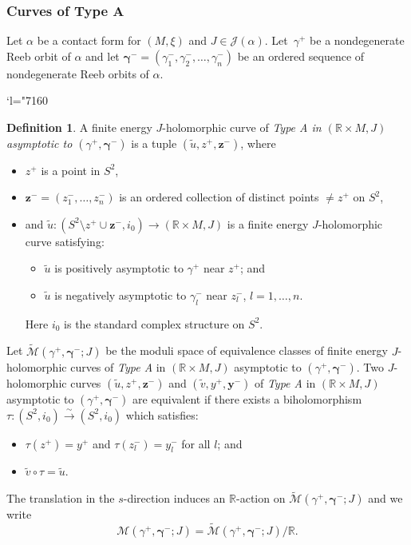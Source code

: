 \documentclass[JEP,XML,SOM,Unicode,NoFloatCountersInSection]{cedram}
\let\mathcal\mathscr
\newcommand{\isom}{\stackrel\sim\longrightarrow}
\newcommand{\bmy}{\boldsymbol{y}}
\newcommand{\bmz}{\boldsymbol{z}}
\newcommand{\Changel}{\mathcode`l="7160}
\theoremstyle{plain}
\theoremstyle{definition}
\newtheorem{defn}[thm]{Definition}
\numberwithin{equation}{subsection}
\newcommand{\RR}{\mathbb{R}}
\let\bs\boldsymbol
\begin{document}
\subsubsection{Curves of Type A} \label{subsubsection: A}

Let $\alpha$ be a contact form for $(M,\xi)$ and $J\in \mathcal{J}(\alpha)$. Let~$\gamma^+$ be a nondegenerate Reeb orbit of $\alpha$ and let $\bs\gamma^-=(\gamma^-_1,\gamma^-_2,\dots,\gamma^-_n)$ be an ordered sequence of nondegenerate Reeb orbits of $\alpha$.

\bgroup
\Changel
\begin{defn}
A finite energy $J$-holomorphic curve of \emph{Type A in $(\mathbb{R}\times M,J)$ asymptotic to $(\gamma^+,\bs\gamma^-)$} is a tuple $(\widetilde{u},z^+,\bmz^-)$, where
\begin{itemize}
\item
$z^+$ is a point in $S^2$,
\item
$\bmz^-=(z^-_1,\dots,z^-_n)$ is an ordered collection of distinct points $\not=z^+$ on $S^2$,
\item
and $\widetilde{u}: (S^2\setminus z^+ \cup \bmz^-,i_0) \to (\mathbb{R}\times M,J)$ is a finite energy $J$-holomorphic curve satisfying:
\begin{itemize}
\item $\widetilde{u}$ is positively asymptotic to $\gamma^+$ near $z^+$; and
\item $\widetilde{u}$ is negatively asymptotic to $\gamma^-_l$ near $z^-_l$, $l=1,\dots, n$.
\end{itemize}
Here $i_0$ is the standard complex structure on $S^2$.
\end{itemize}
\end{defn}

Let $\widetilde{\mathcal{M}}(\gamma^+,\bs\gamma^-;J)$ be the moduli space of equivalence classes of finite energy $J$-holomorphic curves of \emph{Type A} in $(\mathbb{R}\times M,J)$ asymptotic to $(\gamma^+,\bs\gamma^-)$. Two $J$\nobreakdash-holomorphic curves $(\widetilde{u},z^+,\bmz^-)$ and $(\widetilde{v},y^+,\bmy^-)$ of \emph{Type A} in $(\mathbb{R}\times M,J)$ asymptotic to $(\gamma^+,\bs\gamma^-)$ are equivalent if there exists a biholomorphism $\tau:(S^2,i_0)\isom (S^2,i_0)$ which satisfies:
\begin{itemize}
\item $\tau(z^+)=y^+ $ and $\tau(z^-_l)= y^-_l $ for all $l$; and
\item $\widetilde{v} \circ \tau = \widetilde{u}$.
\end{itemize}
The translation in the $s$-direction induces an $\mathbb{R}$-action on $\widetilde{\mathcal{M}}(\gamma^+,\bs\gamma^-;J)$ and we write
$${\mathcal{M}}(\gamma^+,\bs\gamma^-;J)=\widetilde{\mathcal{M}}(\gamma^+,\bs\gamma^-;J)/\RR.$$
\end{document}
